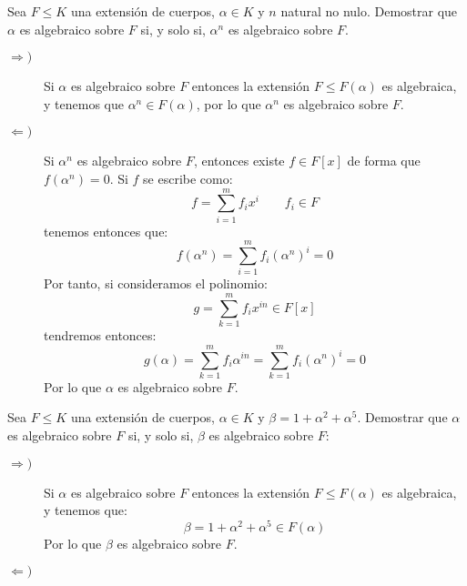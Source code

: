 \begin{ejercicio}
    Sea $F\leq K$ una extensión de cuerpos, $\alpha\in K$ y $n$ natural no nulo. Demostrar que $\alpha$ es algebraico sobre $F$ si, y solo si, $\alpha^n$ es algebraico sobre $F$.\\

    \begin{description}
        \item [$\Longrightarrow )$] Si $\alpha$ es algebraico sobre $F$ entonces la extensión $F\leq F(\alpha)$ es algebraica, y tenemos que $\alpha^n \in F(\alpha)$, por lo que $\alpha^n$ es algebraico sobre $F$.
        \item [$\Longleftarrow )$] Si $\alpha^n$ es algebraico sobre $F$, entonces existe $f\in F[x]$ de forma que $f(\alpha^n) = 0$. Si $f$ se escribe como:
            \begin{equation*}
                f = \sum_{i=1}^{m}f_ix^i \qquad f_i \in F
            \end{equation*}
            tenemos entonces que:
            \begin{equation*}
                f(\alpha^n) = \sum_{i=1}^{m}f_i{(\alpha^n)}^{i} = 0
            \end{equation*}
            Por tanto, si consideramos el polinomio:
            \begin{equation*}
                g = \sum_{k=1}^{m} f_i x^{in} \in F[x]
            \end{equation*}
            tendremos entonces:
            \begin{equation*}
                g(\alpha) = \sum_{k=1}^{m} f_i \alpha^{in} = \sum_{k=1}^{m} f_i{(\alpha^n)}^{i} = 0
            \end{equation*}
            Por lo que $\alpha$ es algebraico sobre $F$.
    \end{description}
\end{ejercicio}

\begin{ejercicio}
    Sea $F\leq K$ una extensión de cuerpos, $\alpha\in K$ y $\beta = 1+\alpha^2 + \alpha^5$. Demostrar que $\alpha$ es algebraico sobre $F$ si, y solo si, $\beta$ es algebraico sobre $F$:

    \begin{description}
        \item [$\Longrightarrow )$] Si $\alpha$ es algebraico sobre $F$ entonces la extensión $F\leq F(\alpha)$ es algebraica, y tenemos que:
            \begin{equation*}
                \beta = 1+\alpha^2 + \alpha^5 \in F(\alpha)
            \end{equation*}
            Por lo que $\beta$ es algebraico sobre $F$.
        \item [$\Longleftarrow )$] %
    \end{description}
\end{ejercicio}

